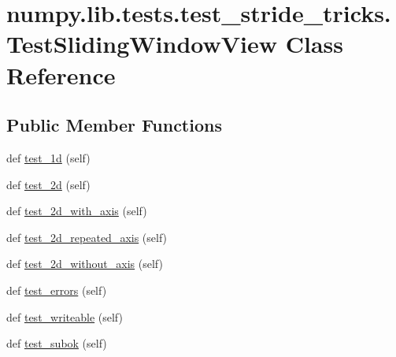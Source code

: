 \hypertarget{classnumpy_1_1lib_1_1tests_1_1test__stride__tricks_1_1TestSlidingWindowView}{}\section{numpy.\+lib.\+tests.\+test\+\_\+stride\+\_\+tricks.\+Test\+Sliding\+Window\+View Class Reference}
\label{classnumpy_1_1lib_1_1tests_1_1test__stride__tricks_1_1TestSlidingWindowView}
\subsection*{Public Member Functions}
\begin{DoxyCompactItemize}
\item 
def \hyperlink{classnumpy_1_1lib_1_1tests_1_1test__stride__tricks_1_1TestSlidingWindowView_a181c506781c606fe6d9fe48461f4eee4}{test\+\_\+1d} (self)
\item 
def \hyperlink{classnumpy_1_1lib_1_1tests_1_1test__stride__tricks_1_1TestSlidingWindowView_a123c9f67db6a7d0ef38a21f206d64255}{test\+\_\+2d} (self)
\item 
def \hyperlink{classnumpy_1_1lib_1_1tests_1_1test__stride__tricks_1_1TestSlidingWindowView_aace0aebfd8067129ef67b9bd191156b3}{test\+\_\+2d\+\_\+with\+\_\+axis} (self)
\item 
def \hyperlink{classnumpy_1_1lib_1_1tests_1_1test__stride__tricks_1_1TestSlidingWindowView_a04092abfe736fadf9d3545736c2269ca}{test\+\_\+2d\+\_\+repeated\+\_\+axis} (self)
\item 
def \hyperlink{classnumpy_1_1lib_1_1tests_1_1test__stride__tricks_1_1TestSlidingWindowView_a5087f24d4953c9a8aa4640724bf8b610}{test\+\_\+2d\+\_\+without\+\_\+axis} (self)
\item 
def \hyperlink{classnumpy_1_1lib_1_1tests_1_1test__stride__tricks_1_1TestSlidingWindowView_ad98dd22589c03618d9be9921262062f9}{test\+\_\+errors} (self)
\item 
def \hyperlink{classnumpy_1_1lib_1_1tests_1_1test__stride__tricks_1_1TestSlidingWindowView_a8ad4485cafc40954c29bfc5730206b21}{test\+\_\+writeable} (self)
\item 
def \hyperlink{classnumpy_1_1lib_1_1tests_1_1test__stride__tricks_1_1TestSlidingWindowView_a81007e5a040286979de78e8ee67ec740}{test\+\_\+subok} (self)
\end{DoxyCompactItemize}


